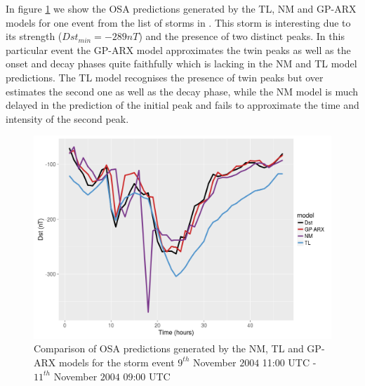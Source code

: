 \documentclass[referee,a4paper,12pt,traditabstract]{swsc}
\begin{document}
\begin{linenumbers}
In figure \ref{fig:predictions} we show the OSA predictions generated by the TL, NM and GP-ARX models for one event from the list of storms in \citet{Ji2012}. This storm is interesting due to its strength ($Dst_{min} = -289 nT$) and the presence of two distinct peaks. In this particular event the GP-ARX model approximates the twin peaks as well as the onset and decay phases quite faithfully which is lacking in the NM and TL model predictions. The TL model recognises the presence of twin peaks but over estimates the second one as well as the decay phase, while the NM model is much delayed in the prediction of the initial peak and fails to approximate the time and intensity of the second peak.    

\begin{figure}
   \centering
   \includegraphics[width=\textwidth]{Compare_pred.png}
      \caption{Comparison of OSA predictions generated by the NM, TL and GP-ARX models for the storm event $9^{th}$ November $2004$ 11:00 UTC - $11^{th}$ November $2004$ 09:00 UTC}
         \label{fig:predictions}
   \end{figure}

  

\end{linenumbers}
\end{document}
